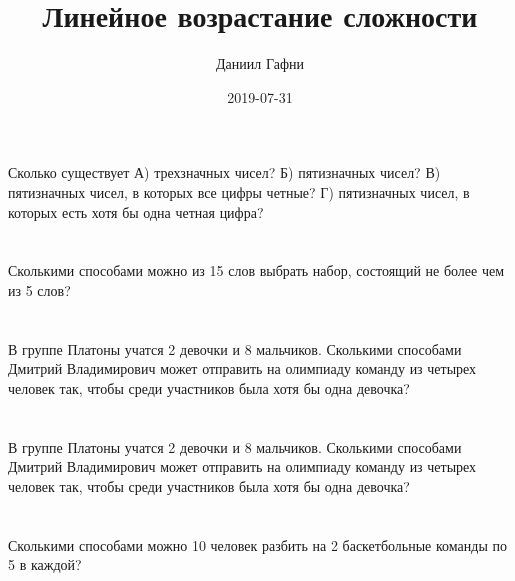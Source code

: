 \documentclass[a4paper,10pt]{article}%
\title{Линейное возрастание сложности}%
\author{Даниил Гафни}%
\date{2019{-}07{-}31}%
\begin{document}
%
\normalsize%
\maketitle%
\section{}%
\label{sec:}%
Сколько существует
А) трехзначных чисел?
Б) пятизначных чисел?
В) пятизначных чисел, в которых все цифры четные?
Г) пятизначных чисел, в которых есть хотя бы одна четная цифра?%
%
\iffalse%
Автор: Ираклий Гагуа%
Дата: 07{-}01{-}2011%
Название: None%
Подсказка: \textbackslash{}\textbackslash{}%
nan%
\fi

%
\section{}%
\label{sec:}%
Сколькими способами можно из 15 слов выбрать набор, состоящий не более чем
из 5 слов?%
%
\iffalse%
Автор: 25 школа%
Дата: 01{-}07{-}2017%
Название: None%
Подсказка: \textbackslash{}\textbackslash{}%
nan%
\fi

%
\section{}%
\label{sec:}%
В группе Платоны учатся 2 девочки и 8 мальчиков. Сколькими способами
Дмитрий Владимирович может отправить на олимпиаду команду из четырех человек
так, чтобы среди участников была хотя бы одна девочка?%
%
\iffalse%
Автор: 25 школа%
Дата: 01{-}07{-}2017%
Название: None%
Подсказка: \textbackslash{}\textbackslash{}%
nan%
\fi

%
\section{}%
\label{sec:}%
В группе Платоны учатся 2 девочки и 8 мальчиков. Сколькими способами
Дмитрий Владимирович может отправить на олимпиаду команду из четырех человек
так, чтобы среди участников была хотя бы одна девочка?%
%
\iffalse%
Автор: 25 школа%
Дата: 01{-}07{-}2017%
Название: None%
Подсказка: \textbackslash{}\textbackslash{}%
nan%
\fi

%
\section{}%
\label{sec:}%
Сколькими способами можно 10 человек разбить на 2 баскетбольные команды
по 5 в каждой?%
%
\iffalse%
Автор: 25 школа%
Дата: 01{-}07{-}2017%
Название: None%
Подсказка: \textbackslash{}\textbackslash{}%
nan%
\fi
\end{document}
